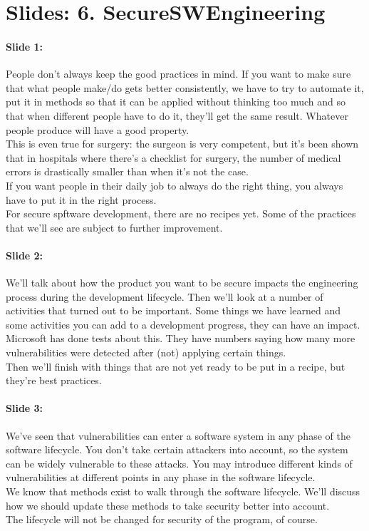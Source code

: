 \documentclass[10pt,a4paper]{report}
\begin{document}
\section{Slides: 6. SecureSWEngineering}

\paragraph{Slide 1:} People don't always keep the good practices in mind. If you want to make sure that what people make/do gets better consistently, we have to try to automate it, put it in methods so that it can be applied without thinking too much and so that when different people have to do it, they'll get the same result. Whatever people produce will have a good property. \\
This is even true for surgery: the surgeon is very competent, but it's been shown that in hospitals where there's a checklist for surgery, the number of medical errors is drastically smaller than when it's not the case.\\
If you want people in their daily job to always do the right thing, you always have to put it in the right process.\\
For secure spftware development, there are no recipes yet. Some of the practices that we'll see are subject to further improvement. 

\paragraph{Slide 2:} We'll talk about how the product you want to be secure impacts the engineering process during the development lifecycle.  Then we'll look at a number of activities that turned out to be important. Some things we have learned and some activities you can add to a development progress, they can have an impact. Microsoft has done tests about this. They have numbers saying how many more vulnerabilities were detected after (not) applying certain things.\\
Then we'll finish with things that are not yet ready to be put in a recipe, but they're best practices.

\paragraph{Slide 3:} We've seen that vulnerabilities can enter a software system in any phase of the software lifecycle. You don't take certain attackers into account, so the system can be widely vulnerable to these attacks. You may introduce different kinds of vulnerabilities at different points in any phase in the software lifecycle.\\
We know that methods exist to walk through the software lifecycle. We'll discuss how we should update these methods to take security better into account.\\
The lifecycle will not be changed for security of the program, of course.
\end{document}
